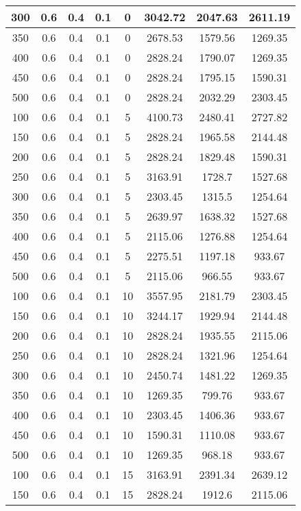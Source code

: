 \documentclass[a4paper, 12pt]{extreport}
\begin{document}
\begin{itemize}
\begin{longtable}{|c|c|c|c|c|c|c|c|}
			300 & 0.6 & 0.4 & 0.1 & 0 & 3042.72 & 2047.63 & 2611.19 \\\hline
			350 & 0.6 & 0.4 & 0.1 & 0 & 2678.53 & 1579.56 & 1269.35 \\\hline
			400 & 0.6 & 0.4 & 0.1 & 0 & 2828.24 & 1790.07 & 1269.35 \\\hline
			450 & 0.6 & 0.4 & 0.1 & 0 & 2828.24 & 1795.15 & 1590.31 \\\hline
			500 & 0.6 & 0.4 & 0.1 & 0 & 2828.24 & 2032.29 & 2303.45 \\\hline
			100 & 0.6 & 0.4 & 0.1 & 5 & 4100.73 & 2480.41 & 2727.82 \\\hline
			150 & 0.6 & 0.4 & 0.1 & 5 & 2828.24 & 1965.58 & 2144.48 \\\hline
			200 & 0.6 & 0.4 & 0.1 & 5 & 2828.24 & 1829.48 & 1590.31 \\\hline
			250 & 0.6 & 0.4 & 0.1 & 5 & 3163.91 & 1728.7 & 1527.68 \\\hline
			300 & 0.6 & 0.4 & 0.1 & 5 & 2303.45 & 1315.5 & 1254.64 \\\hline
			350 & 0.6 & 0.4 & 0.1 & 5 & 2639.97 & 1638.32 & 1527.68 \\\hline
			400 & 0.6 & 0.4 & 0.1 & 5 & 2115.06 & 1276.88 & 1254.64 \\\hline
			450 & 0.6 & 0.4 & 0.1 & 5 & 2275.51 & 1197.18 & 933.67 \\\hline
			500 & 0.6 & 0.4 & 0.1 & 5 & 2115.06 & 966.55 & 933.67 \\\hline
			100 & 0.6 & 0.4 & 0.1 & 10 & 3557.95 & 2181.79 & 2303.45 \\\hline
			150 & 0.6 & 0.4 & 0.1 & 10 & 3244.17 & 1929.94 & 2144.48 \\\hline
			200 & 0.6 & 0.4 & 0.1 & 10 & 2828.24 & 1935.55 & 2115.06 \\\hline
			250 & 0.6 & 0.4 & 0.1 & 10 & 2828.24 & 1321.96 & 1254.64 \\\hline
			300 & 0.6 & 0.4 & 0.1 & 10 & 2450.74 & 1481.22 & 1269.35 \\\hline
			350 & 0.6 & 0.4 & 0.1 & 10 & 1269.35 & 799.76 & 933.67 \\\hline
			400 & 0.6 & 0.4 & 0.1 & 10 & 2303.45 & 1406.36 & 933.67 \\\hline
			450 & 0.6 & 0.4 & 0.1 & 10 & 1590.31 & 1110.08 & 933.67 \\\hline
			500 & 0.6 & 0.4 & 0.1 & 10 & 1269.35 & 968.18 & 933.67 \\\hline
			100 & 0.6 & 0.4 & 0.1 & 15 & 3163.91 & 2391.34 & 2639.12 \\\hline
			150 & 0.6 & 0.4 & 0.1 & 15 & 2828.24 & 1912.6 & 2115.06 \\\hline

\end{longtable}
\end{itemize}
\end{document}
